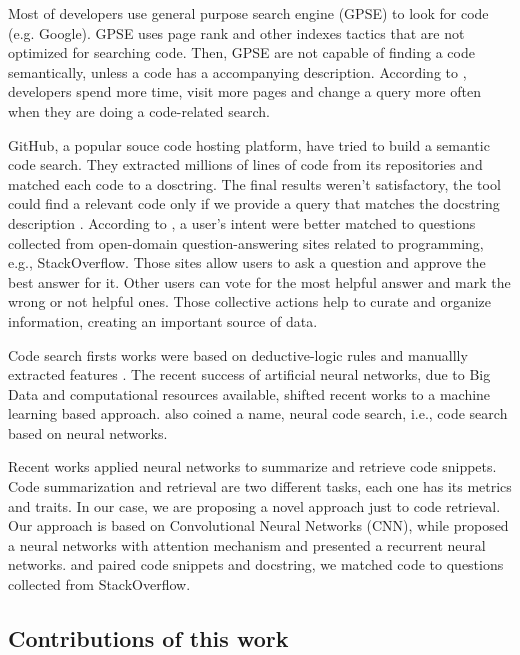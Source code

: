 \documentclass[sigconf]{acmart}
\begin{document}
Most of developers use general purpose search engine (GPSE) to look for code (e.g. Google). GPSE uses page rank and other indexes tactics that are not optimized for searching code. Then, GPSE are not capable of finding a code semantically, unless a code has a accompanying description. According to \cite{masudur-developers-use-google-code-retrieval:2018}, developers spend more time, visit more pages and change a query more often when they are doing a code-related search.

GitHub, a popular souce code hosting platform, have tried to build a semantic code search. They extracted millions of lines of code from its repositories and matched each code to a dosctring. The final results weren't satisfactory, the tool could find a relevant code only if we provide a query that matches the docstring description \citep{husain-github-semantic-search-code-2019}. According to \cite{cambronero-deep-code-search-2019}, a user's intent were better matched to questions collected from open-domain question-answering sites related to programming, e.g., StackOverflow. Those sites allow users to ask a question and approve the best answer for it. Other users can vote for the most helpful answer and mark the wrong or not helpful ones. Those collective actions help to curate and organize information, creating an important source of data.

Code search firsts works were based on deductive-logic rules and manuallly extracted features \cite{Allamanis:2018:SML}. The recent success of artificial neural networks, due to Big Data and computational resources available, shifted recent works to a machine learning based approach. \cite{cambronero-deep-code-search-2019} also coined a name, neural code search, i.e., code search based on neural networks.

Recent works applied neural networks to summarize and retrieve code snippets. Code summarization and retrieval are two different tasks, each one has its metrics and traits. In our case, we are proposing a novel approach just to code retrieval. Our approach is based on Convolutional Neural Networks (CNN), while \cite{cambronero-deep-code-search-2019} proposed a neural networks with attention mechanism and \cite{Gu-deep-code-search:2018} presented a recurrent neural networks. \cite{cambronero-deep-code-search-2019} and \cite{Gu-deep-code-search:2018} paired code snippets and docstring, we matched code to questions collected from StackOverflow.

\subsection{Contributions of this work}
\end{document}
